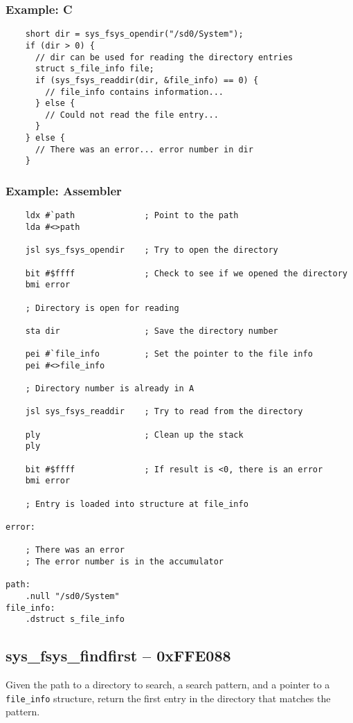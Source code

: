 \subsubsection*{Example: C}
\begin{lstlisting}
    short dir = sys_fsys_opendir("/sd0/System");
    if (dir > 0) {
      // dir can be used for reading the directory entries
      struct s_file_info file;
      if (sys_fsys_readdir(dir, &file_info) == 0) {
        // file_info contains information...
      } else {
        // Could not read the file entry...
      }
    } else {
      // There was an error... error number in dir
    }
\end{lstlisting}

\subsubsection*{Example: Assembler}
\begin{verbatim}
    ldx #`path              ; Point to the path
    lda #<>path

    jsl sys_fsys_opendir    ; Try to open the directory

    bit #$ffff              ; Check to see if we opened the directory
    bmi error

    ; Directory is open for reading

    sta dir                 ; Save the directory number

    pei #`file_info         ; Set the pointer to the file info
    pei #<>file_info

    ; Directory number is already in A

    jsl sys_fsys_readdir    ; Try to read from the directory

    ply                     ; Clean up the stack
    ply

    bit #$ffff              ; If result is <0, there is an error
    bmi error

    ; Entry is loaded into structure at file_info

error:

    ; There was an error
    ; The error number is in the accumulator

path:
    .null "/sd0/System"
file_info:
    .dstruct s_file_info
\end{verbatim}


\subsection*{sys\_fsys\_findfirst -- 0xFFE088}
Given the path to a directory to search, a search pattern, and a pointer to a \verb+file_info+ structure, return the first entry in the directory that matches the pattern.

